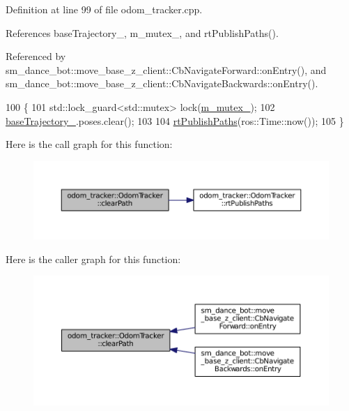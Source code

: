 Definition at line 99 of file odom\+\_\+tracker.\+cpp.



References base\+Trajectory\+\_\+, m\+\_\+mutex\+\_\+, and rt\+Publish\+Paths().



Referenced by sm\+\_\+dance\+\_\+bot\+::move\+\_\+base\+\_\+z\+\_\+client\+::\+Cb\+Navigate\+Forward\+::on\+Entry(), and sm\+\_\+dance\+\_\+bot\+::move\+\_\+base\+\_\+z\+\_\+client\+::\+Cb\+Navigate\+Backwards\+::on\+Entry().


\begin{DoxyCode}
100 \{
101     std::lock\_guard<std::mutex> lock(\hyperlink{classodom__tracker_1_1OdomTracker_a17f1d82ae3d6441a4387af8fb83a3e20}{m\_mutex\_});
102     \hyperlink{classodom__tracker_1_1OdomTracker_a889adca220c33056d9a582eceda64adc}{baseTrajectory\_}.poses.clear();
103 
104     \hyperlink{classodom__tracker_1_1OdomTracker_ade06ab05e1853fbccd3702f88f0a42e5}{rtPublishPaths}(ros::Time::now());
105 \}
\end{DoxyCode}


Here is the call graph for this function\+:
\nopagebreak
\begin{figure}[H]
\begin{center}
\leavevmode
\includegraphics[width=350pt]{classodom__tracker_1_1OdomTracker_a03c47908606d48e20b3b7e7b583b341d_cgraph}
\end{center}
\end{figure}




Here is the caller graph for this function\+:
\nopagebreak
\begin{figure}[H]
\begin{center}
\leavevmode
\includegraphics[width=350pt]{classodom__tracker_1_1OdomTracker_a03c47908606d48e20b3b7e7b583b341d_icgraph}
\end{center}
\end{figure}


